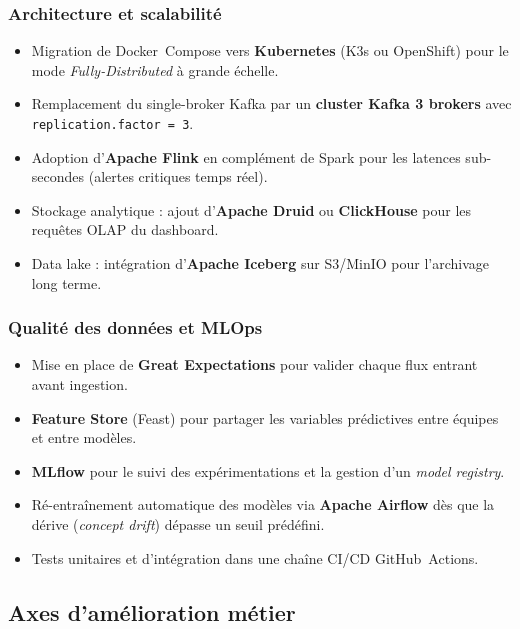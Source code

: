 \documentclass[11pt,a4paper]{article}
\begin{document}
\subsubsection{Architecture et scalabilité}
\begin{itemize}
  \item Migration de Docker~Compose vers \textbf{Kubernetes} (K3s ou OpenShift) pour le mode \emph{Fully-Distributed} à grande échelle.
  \item Remplacement du single-broker Kafka par un \textbf{cluster Kafka 3 brokers} avec \texttt{replication.factor = 3}.
  \item Adoption d'\textbf{Apache Flink} en complément de Spark pour les latences sub-secondes (alertes critiques temps réel).
  \item Stockage analytique : ajout d'\textbf{Apache Druid} ou \textbf{ClickHouse} pour les requêtes OLAP du dashboard.
  \item Data lake : intégration d'\textbf{Apache Iceberg} sur S3/MinIO pour l'archivage long terme.
\end{itemize}

\subsubsection{Qualité des données et MLOps}
\begin{itemize}
  \item Mise en place de \textbf{Great Expectations} pour valider chaque flux entrant avant ingestion.
  \item \textbf{Feature Store} (Feast) pour partager les variables prédictives entre équipes et entre modèles.
  \item \textbf{MLflow} pour le suivi des expérimentations et la gestion d'un \emph{model registry}.
  \item Ré-entraînement automatique des modèles via \textbf{Apache Airflow} dès que la dérive (\emph{concept drift}) dépasse un seuil prédéfini.
  \item Tests unitaires et d'intégration dans une chaîne CI/CD GitHub~Actions.
\end{itemize}

\subsection{Axes d'amélioration métier}
\end{document}
